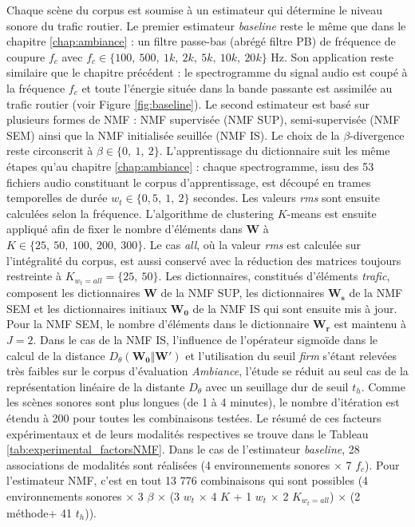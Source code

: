 Chaque scène du corpus est soumise à un estimateur qui détermine le niveau sonore du trafic routier. 
Le premier estimateur \textit{baseline} reste le même que dans le chapitre \ref{chap:ambiance} : un filtre passe-bas (abrégé filtre PB) de fréquence de coupure $f_c$ avec $f_c \in \lbrace 100,~500,~1k,~2k,~5k,~10k,~20k \rbrace$ Hz. Son application reste similaire que le chapitre précédent : le spectrogramme du signal audio est coupé à la fréquence $f_c$ et toute l'énergie située dans la bande passante est assimilée au trafic routier (voir Figure \ref{fig:baseline}).
Le second estimateur est basé sur plusieurs formes de NMF : NMF supervisée (NMF SUP), semi-supervisée (NMF SEM) ainsi que la NMF initialisée seuillée (NMF IS). Le choix de la $\beta$-divergence reste circonscrit à $\beta \in \lbrace 0,~1,~2 \rbrace$.
L'apprentissage du dictionnaire suit les même étapes qu'au chapitre \ref{chap:ambiance} : chaque spectrogramme, issu des 53 fichiers audio constituant le corpus d'apprentissage, est découpé en trames temporelles de durée $w_t \in \lbrace 0,5,~1,~2 \rbrace$ secondes. Les valeurs \textit{rms} sont ensuite calculées selon la fréquence. L'algorithme de clustering $K$-means est ensuite appliqué afin de fixer le nombre d'éléments dans $\mathbf{W}$ à $K \in \lbrace 25,~50,~100,~200,~ 300 \rbrace$. Le cas \textit{all}, où la valeur \textit{rms} est calculée sur l'intégralité du corpus, est aussi conservé avec la réduction des matrices toujours restreinte à $K_{w_t = all} = \lbrace 25,~50 \rbrace$. Les dictionnaires, constitués d'éléments \textit{trafic}, composent les dictionnaires $\mathbf{W}$ de la NMF SUP, les dictionnaires $\mathbf{W_s}$ de la NMF SEM et les dictionnaires initiaux $\mathbf{W_0}$ de la NMF IS qui sont ensuite mis à jour.
Pour la NMF SEM, le nombre d'éléments dans le dictionnaire $\mathbf{W_r}$ est maintenu à $J = 2$.
Dans le cas de la NMF IS, l'influence de l'opérateur sigmoïde dans le calcul de la distance $D_{\theta}(\mathbf{W_0}\Vert \mathbf{W'})$ et l'utilisation du seuil \textit{firm} s'étant relevées très faibles sur le corpus d'évaluation \textit{Ambiance}, l'étude se réduit au seul cas de la représentation linéaire de la distante $D_{\theta}$ avec un seuillage dur de seuil $t_h$.
Comme les scènes sonores sont plus longues (de 1 à 4 minutes), le nombre d'itération est étendu à 200 pour toutes les combinaisons testées. 
Le résumé de ces facteurs expérimentaux et de leurs modalités respectives se trouve dans le Tableau \ref{tab:experimental_factorsNMF}. Dans le cas de l'estimateur \textit{baseline}, 28 associations de modalités sont réalisées (4 environnements sonores $\times$ 7 $f_c$). Pour l'estimateur NMF, c'est en tout 13 776 combinaisons qui sont possibles (4 environnements sonores $\times$ 3 $\beta$ $\times$ (3 $w_t$ $\times$ 4 $K$ + 1 $w_t$ $\times$ 2 $K_{w_t = all}$) $\times$ (2 méthode+ 41 $t_h$)).

